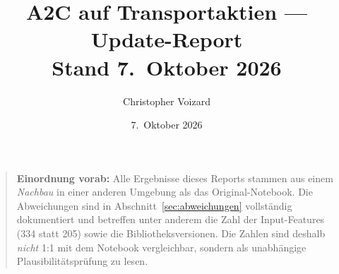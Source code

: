 \documentclass[11pt,a4paper]{article}
\title{\bfseries A2C auf Transportaktien --- Update-Report\\[0.4em]
       \large Stand 7.\ Oktober 2026}
\author{Christopher Voizard}
\date{7.\ Oktober 2026}
\begin{document}
\maketitle
\thispagestyle{empty}

\vfill
\begin{quote}
\textbf{Einordnung vorab:} Alle Ergebnisse dieses Reports stammen aus einem \emph{Nachbau}
in einer anderen Umgebung als das Original-Notebook. Die Abweichungen sind in
Abschnitt~\ref{sec:abweichungen} vollständig dokumentiert und betreffen unter anderem die
Zahl der Input-Features (334 statt 205) sowie die Bibliotheksversionen. Die Zahlen sind
deshalb \emph{nicht} 1:1 mit dem Notebook vergleichbar, sondern als unabhängige
Plausibilitätsprüfung zu lesen.
\end{quote}
\vfill

\newpage
\tableofcontents
\newpage







\end{document}
